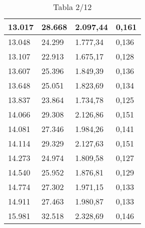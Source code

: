 \begin{table}[H]
{\begin{tabular}{| l | l | l |l |}
13.017	&	28.668	&	2.097,44	&	0,161	\\ \hline
13.048	&	24.299	&	1.777,34	&	0,136	\\ \hline
13.107	&	22.913	&	1.675,17	&	0,128	\\ \hline
13.607	&	25.396	&	1.849,39	&	0,136	\\ \hline
13.648	&	25.051	&	1.823,69	&	0,134	\\ \hline
13.837	&	23.864	&	1.734,78	&	0,125	\\ \hline
14.066	&	29.308	&	2.126,86	&	0,151	\\ \hline
14.081	&	27.346	&	1.984,26	&	0,141	\\ \hline
14.114	&	29.329	&	2.127,63	&	0,151	\\ \hline
14.273	&	24.974	&	1.809,58	&	0,127	\\ \hline
14.540	&	25.952	&	1.876,81	&	0,129	\\ \hline
14.774	&	27.302	&	1.971,15	&	0,133	\\ \hline
14.911	&	27.463	&	1.980,87	&	0,133	\\ \hline
15.981	&	32.518	&	2.328,69	&	0,146	\\ \hline
  \end{tabular}
  \caption*{Tabla 2/12}
}
\end{table}
